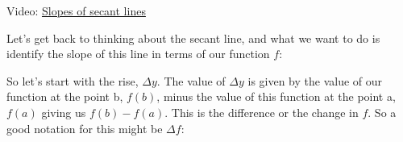 \documentclass[pdftex, brazil, 12pt, twoside]{article}
\begin{document}
Video: \href{https://www.youtube.com/watch?v=\_9JlzGzki4c}{Slopes of secant lines}

Let's get back to thinking about the secant line,
and what we want to do is identify
the slope of this line in terms of our function $f$:

\begin{figure}[H]
  \begin{center}
  \end{center}
\end{figure}

So let's start with the rise, $\Delta y$.
The value of $\Delta y$ is given by the value
of our function at the point b, $f(b)$,
minus the value of this function at the point a, $f(a)$
giving us $f(b) - f(a)$.
This is the difference or the change in $f$.
So a good notation for this might be $\Delta f$:

\begin{figure}[H]
  \begin{center}
  \end{center}
\end{figure}
\end{document}
